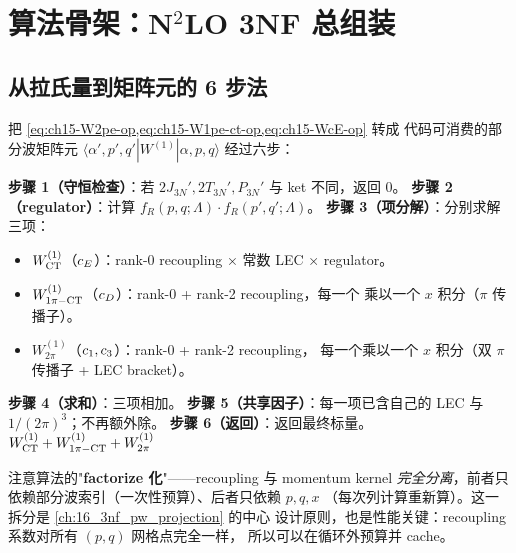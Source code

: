 \section{算法骨架：N\({}^2\)LO 3NF 总组装}
\label{sec:ch15-algorithm}

\subsection{从拉氏量到矩阵元的 6 步法}
\label{subsec:ch15-6-step}

把 \cref{eq:ch15-W2pe-op,eq:ch15-W1pe-ct-op,eq:ch15-WcE-op} 转成
代码可消费的部分波矩阵元 \(\langle \alpha', p', q' | W^{(1)} | \alpha, p, q
\rangle\) 经过六步：

\begin{algorithm}[H]
\caption{N\(^2\)LO 3NF 矩阵元 \(\langle \alpha', p', q' | W^{(1)} | \alpha, p, q \rangle\)
         的总组装流程。}
\label{alg:ch15-W1-assembly}
\BlankLine
\textbf{步骤 1（守恒检查）}：若 \(2J_{3N}', 2T_{3N}', P_{3N}'\) 与 ket 不同，返回 0。
\textbf{步骤 2（regulator）}：计算 \(f_R(p, q; \Lambda) \cdot f_R(p', q'; \Lambda)\)。
\textbf{步骤 3（项分解）}：分别求解三项：
\begin{itemize}
\item \(W^{(1)}_{\rm CT}\)（\(c_E\)）：rank-0 recoupling × 常数 LEC × regulator。
\item \(W^{(1)}_{1\pi-{\rm CT}}\)（\(c_D\)）：rank-0 + rank-2 recoupling，每一个
      乘以一个 \(x\) 积分（\(\pi\) 传播子）。
\item \(W^{(1)}_{2\pi}\)（\(c_1, c_3\)）：rank-0 + rank-2 recoupling，
      每一个乘以一个 \(x\) 积分（双 \(\pi\) 传播子 + LEC bracket）。
\end{itemize}
\textbf{步骤 4（求和）}：三项相加。
\textbf{步骤 5（共享因子）}：每一项已含自己的 LEC 与 \(1/(2\pi)^3\)；不再额外除。
\textbf{步骤 6（返回）}：返回最终标量。
\Return $W^{(1)}_{\rm CT} + W^{(1)}_{1\pi-{\rm CT}} + W^{(1)}_{2\pi}$\;
\end{algorithm}

注意算法的"\textbf{factorize 化}"——recoupling 与 momentum kernel
\emph{完全分离}，前者只依赖部分波索引（一次性预算）、后者只依赖 \(p, q, x\)
（每次列计算重新算）。这一拆分是 \cref{ch:16_3nf_pw_projection} 的中心
设计原则，也是性能关键：recoupling 系数对所有 \((p, q)\) 网格点完全一样，
所以可以在循环外预算并 cache。

